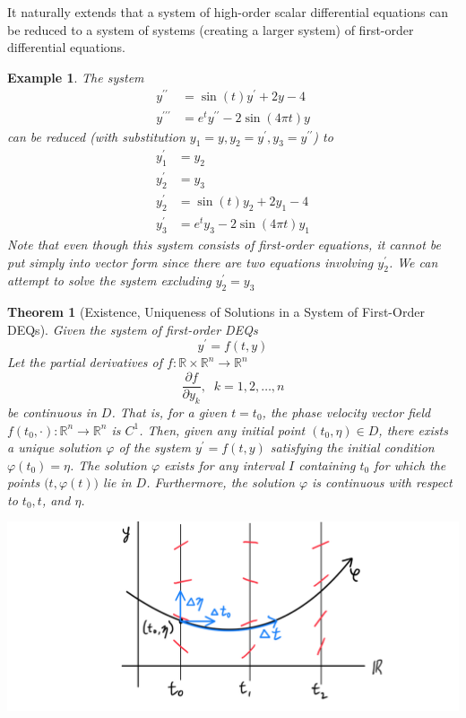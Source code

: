 \documentclass{article}
\newtheorem{theorem}{Theorem}[section]
\newtheorem{example}{Example}[section]
\theoremstyle{remark}
\theoremstyle{definition}
\begin{document}
It naturally extends that a system of high-order scalar differential equations can be reduced to a system of systems (creating a larger system) of first-order differential equations. 

\begin{example}
The system 
\begin{align*}
    y^{\prime\prime} & = \sin{(t)} y^\prime + 2y - 4 \\
    y^{\prime\prime\prime} & = e^t y^{\prime\prime} - 2\sin{(4\pi t)} y
\end{align*}
can be reduced (with substitution $y_1 = y, y_2 = y^\prime, y_3 = y^{\prime\prime}$) to 
\begin{align*}
    y_1^\prime & = y_2 \\
    y_2^\prime & = y_3 \\
    y_2^\prime & = \sin(t) y_2 + 2y_1 - 4 \\
    y_3^\prime & = e^t y_3 - 2\sin{(4\pi t)} y_1
\end{align*}
Note that even though this system consists of first-order equations, it cannot be put simply into vector form since there are two equations involving $y_2^\prime$. We can attempt to solve the system excluding $y_2^\prime = y_3$
\end{example}

\begin{theorem}[Existence, Uniqueness of Solutions in a System of First-Order DEQs]
Given the system of first-order DEQs 
\[y^\prime = f(t, y)\]
Let the partial derivatives of $f: \mathbb{R} \times \mathbb{R}^n \longrightarrow \mathbb{R}^n$
\[\frac{\partial f}{\partial y_k}, \;\; k = 1, 2, \ldots, n\]
be continuous in $D$. That is, for a given $t = t_0$, the phase velocity vector field $f(t_0, \cdot): \mathbb{R}^n \longrightarrow \mathbb{R}^n$ is $C^1$. Then, given any initial point $(t_0, \eta) \in D$, there exists a unique solution $\varphi$ of the system $y^\prime = f(t, y)$ satisfying the initial condition $\varphi(t_0) = \eta$. The solution $\varphi$ exists for any interval $I$ containing $t_0$ for which the points $\big(t, \varphi(t)\big)$ lie in $D$. Furthermore, the solution $\varphi$ is continuous with respect to $t_0, t$, and $\eta$. 
\begin{center}
    \includegraphics[scale=0.25]{img/Continuous_w_respect_to_3_things.PNG}
\end{center}
\end{theorem}
\end{document}
